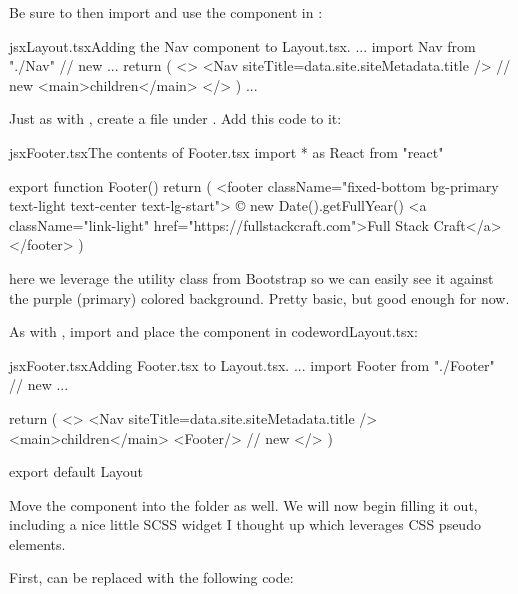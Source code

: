 \documentclass[paper=6in:9in,pagesize=pdftex,headinclude=on,footinclude=on,12pt,twoside]{scrbook}
\begin{document}
Be sure to then import and use the  component in :

\begin{codeInput}{jsx}{Layout.tsx}{Adding the Nav component to Layout.tsx.}
...
import { Nav } from "./Nav" // new
...
return (
  <>
    <Nav siteTitle={data.site.siteMetadata.title} /> // new
    <main>{children}</main>
  </>
)
...
\end{codeInput}


Just as with , create a  file under . Add this code to it:

\begin{codeInput}{jsx}{Footer.tsx}{The contents of Footer.tsx}
import * as React from "react"

export function Footer() {
  return (
    <footer className="fixed-bottom bg-primary text-light text-center text-lg-start">
      © {new Date().getFullYear()} <a className="link-light" href="https://fullstackcraft.com">Full Stack Craft</a>
    </footer>
  )
}
\end{codeInput}

here we leverage the  utility class from Bootstrap so we can easily see it against the purple (primary) colored background. Pretty basic, but good enough for now.

As with  , import and place the  component in codeword{Layout.tsx}:

\begin{codeInput}{jsx}{Footer.tsx}{Adding Footer.tsx to Layout.tsx.}
...
import { Footer } from "./Footer" // new
...

return (
  <>
    <Nav siteTitle={data.site.siteMetadata.title} />
    <main>{children}</main>
    <Footer/> // new
  </>
)

export default Layout  
\end{codeInput}


Move the  component into the  folder as well. We will now begin filling it out, including a nice little SCSS widget I thought up which leverages CSS pseudo elements.

First,  can be replaced with the following code:
\end{document}
